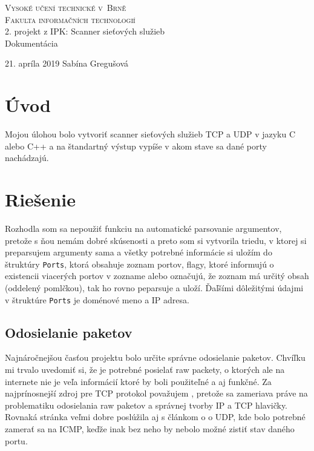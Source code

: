 \documentclass[11pt, a4paper]{article}
\begin{document}
\begin{titlepage}
\begin{center}
\Huge
\textsc{Vysoké učení technické v~Brně}\\
\huge
\textsc{Fakulta informačních technologií}\\
\LARGE 2. projekt z IPK: Scanner sieťových služieb\\
\Huge Dokumentácia
\end{center}
{\Large 21. apríla 2019 \hfill
Sabína Gregušová}
\end{titlepage}

\tableofcontents
\clearpage

\section{Úvod}
Mojou úlohou bolo vytvoriť scanner sieťových služieb TCP a UDP v jazyku C alebo C++ a na štandartný výstup vypíše v akom stave sa dané porty nachádzajú.

\section{Riešenie}
Rozhodla som sa nepoužiť funkciu na automatické parsovanie argumentov, pretože s ňou nemám dobré skúsenosti a preto som si vytvorila triedu, v ktorej si preparsujem argumenty sama a všetky potrebné informácie si uložím do štruktúry \texttt{Ports}, ktorá obsahuje zoznam portov, flagy, ktoré informujú o existencii viacerých portov v zozname alebo označujú, že zoznam má určitý obsah (oddelený pomlčkou), tak ho rovno peparsuje a uloží. Ďaľšími dôležitými údajmi v štruktúre \texttt{Ports} je doménové meno a IP adresa.

\subsection{Odosielanie paketov}
Najnáročnejšou časťou projektu bolo určite správne odosielanie paketov. Chvíľku mi trvalo uvedomiť si, že je potrebné posielať raw packety, o ktorých ale na internete nie je veľa informácií ktoré by boli použiteľné a aj funkčné. Za najprínosnejší zdroj pre TCP protokol považujem \cite{tcp_tenouk}, pretože sa zameriava práve na problematiku odosielania raw paketov a správnej tvorby IP a TCP hlavičky. Rovnaká stránka veľmi dobre poslúžila aj s článkom o \cite{udp_tenouk} o UDP, kde bolo potrebné zamerať sa na ICMP, keďže inak bez neho by nebolo možné zistiť stav daného portu.
\end{document}
